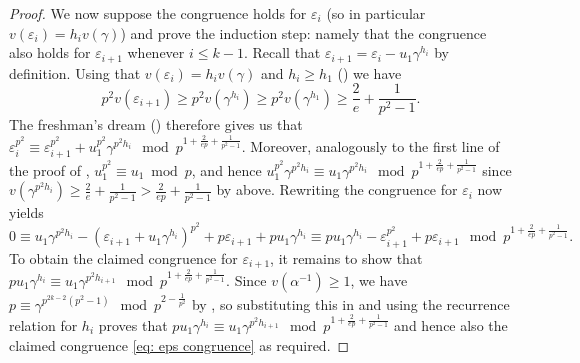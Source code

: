 \documentclass[10pt,a4paper]{amsart}
\begin{document}
\begin{proof}
    We now suppose the congruence holds for $\varepsilon_i$ (so in particular $v(\varepsilon_i)=h_iv(\gamma)$) and prove the induction step: namely that the congruence also holds for $\varepsilon_{i+1}$ whenever $i \leq k-1$. 
    Recall that $\varepsilon_{i+1}=\varepsilon_{i}-u_1\gamma^{h_i}$ by definition. Using that $v(\varepsilon_{i})=h_iv(\gamma)$ and $h_i \geq h_1$ () we have
    \[
    p^2v(\varepsilon_{i+1}) \geq p^2v(\gamma^{h_i}) \geq p^2v(\gamma^{h_1}) \geq \frac{2}{e}+\frac{1}{p^2-1}.
    \]
    The freshman's dream () therefore gives us that $\varepsilon_{i}^{p^2} \equiv \varepsilon_{i+1}^{p^2} + u_1^{p^2}\gamma^{p^2h_i} \mod p^{1+\frac{2}{ep}+\frac{1}{p^2-1}}$. Moreover, analogously to the first line of the proof of , $u_1^{p^2}\equiv u_1 \bmod p$, and hence $u_1^{p^2} \gamma^{p^2 h_i} \equiv u_1 \gamma^{p^2h_i} \mod p^{1+\frac{2}{ep}+\frac{1}{p^2-1}}$ since $v(\gamma^{p^2h_i}) \ge\frac{2}{e}+\frac{1}{p^2-1} > \frac{2}{ep} + \frac{1}{p^2-1}$ by above.
    Rewriting the congruence for $\varepsilon_i$ now yields
    \begin{equation*}
        0 \equiv u_1\gamma^{p^2h_i} - (\varepsilon_{i+1} + u_1\gamma^{h_i})^{p^2} + p\varepsilon_{i+1} + pu_1\gamma^{h_i} \equiv p u_1 \gamma^{h_i} - \varepsilon_{i+1}^{p^2} + p\varepsilon_{i+1} \mod p^{1+\frac{2}{ep}+\frac{1}{p^2-1}}.
    \end{equation*}
    To obtain the claimed congruence for $\varepsilon_{i+1}$, it remains to show that $pu_1 \gamma^{h_i} \equiv u_1\gamma^{p^2h_{i+1}} \mod p^{1+\frac{2}{ep}+\frac{1}{p^2-1}}.$ Since $v(\alpha^{-1}) \geq 1$, we have $p \equiv \gamma^{p^{2k-2}(p^2-1)} \mod p^{2 - \frac{1}{p^2}}$ by , so substituting this in and using the recurrence relation for $h_i$ proves that $pu_1 \gamma^{h_i} \equiv u_1\gamma^{p^2h_{i+1}} \mod p^{1+\frac{2}{ep}+\frac{1}{p^2-1}}$ and hence also the claimed congruence \eqref{eq: eps congruence} as required.
\end{proof}
\end{document}

